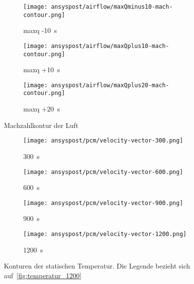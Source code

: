 \begin{figure}[H]
    \centering

    \begin{subfigure}{\textwidth}
        \centering
        \texttt{[image: ansyspost/airflow/maxQminus10-mach-contour.png]}
        \caption{\ac{maxq} -\SI{10}{\second}}
        \label{fig:maxQminus10_mach_contour}
    \end{subfigure}

    \begin{subfigure}{\textwidth}
        \centering
        \texttt{[image: ansyspost/airflow/maxQplus10-mach-contour.png]}
        \caption{\ac{maxq} +\SI{10}{\second}}
        \label{fig:maxQplus10_mach_contour}
    \end{subfigure}

    \begin{subfigure}{\textwidth}
        \centering
        \texttt{[image: ansyspost/airflow/maxQplus20-mach-contour.png]}
        \caption{\ac{maxq} +\SI{20}{\second}}
        \label{fig:maxQplus20_mach_contour}
    \end{subfigure}

    \caption{Machzahlkontur der Luft}
    \label{fig:airflow_mach_contour_continued}
\end{figure}

\begin{figure}[H]
    \centering

    \begin{subfigure}[t]{0.14\textwidth}
        \centering
    \end{subfigure}%
    \hspace{2mm}%
    \begin{subfigure}[t]{0.2\textwidth}
        \centering
        \texttt{[image: ansyspost/pcm/velocity-vector-300.png]}
        \caption{\SI{300}{\second}}\label{fig:velocity_vector_300}
    \end{subfigure}%
    \begin{subfigure}[t]{0.2\textwidth}
        \centering
        \texttt{[image: ansyspost/pcm/velocity-vector-600.png]}
        \caption{\SI{600}{\second}}\label{fig:velocity_vector_600}
    \end{subfigure}%
    \begin{subfigure}[t]{0.2\textwidth}
        \centering
        \texttt{[image: ansyspost/pcm/velocity-vector-900.png]}
        \caption{\SI{900}{\second}}\label{fig:velocity_vector_900}
    \end{subfigure}%
    \begin{subfigure}[t]{0.2\textwidth}
        \centering
        \texttt{[image: ansyspost/pcm/velocity-vector-1200.png]}
        \caption{\SI{1200}{\second}}\label{fig:velocity_vector_1200}
    \end{subfigure}
    \caption{Konturen der statischen Temperatur. Die Legende bezieht sich auf~\ref{fig:temperatur_1200}}\label{fig:pcm_static_temperature_kontur}
\end{figure}